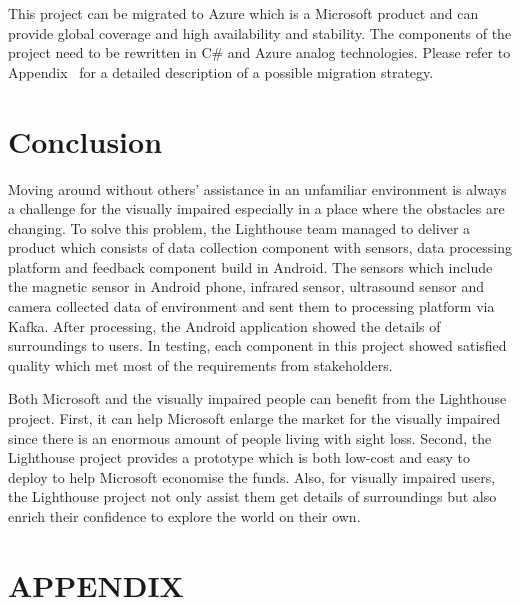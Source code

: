 \documentclass[prodmode,acmtosem]{acmsmall} %
\begin{document}
This project can be migrated to Azure which is a Microsoft product and can provide global coverage and high availability and stability. The components of the project need to be rewritten in C\# and Azure analog technologies. Please refer to Appendix~\cite{app:MigrationPlan} for a detailed description of a possible migration strategy.


\section{Conclusion}
Moving around without others’ assistance in an unfamiliar environment is always a challenge for the visually impaired especially in a place where the obstacles are changing. To solve this problem, the Lighthouse team managed to deliver a product which consists of data collection component with sensors, data processing platform and feedback component build in Android. The sensors which include the magnetic sensor in Android phone, infrared sensor, ultrasound sensor and camera collected data of environment and sent them to processing platform via Kafka. After processing, the Android application showed the details of surroundings to users. In testing, each component in this project showed satisfied quality which met most of the requirements from stakeholders. 

Both Microsoft and the visually impaired people can benefit from the Lighthouse project. First, it can help Microsoft enlarge the market for the visually impaired since there is an enormous amount of people living with sight loss. Second, the Lighthouse project provides a prototype which is both low-cost and easy to deploy to help Microsoft economise the funds. Also, for visually impaired users, the Lighthouse project not only assist them get details of surroundings but also enrich their confidence to explore the world on their own. 



\appendix
\section*{APPENDIX} \label{Appendix}
\setcounter{section}{1}


\begin{acks}
\end{acks}  
\end{document}
